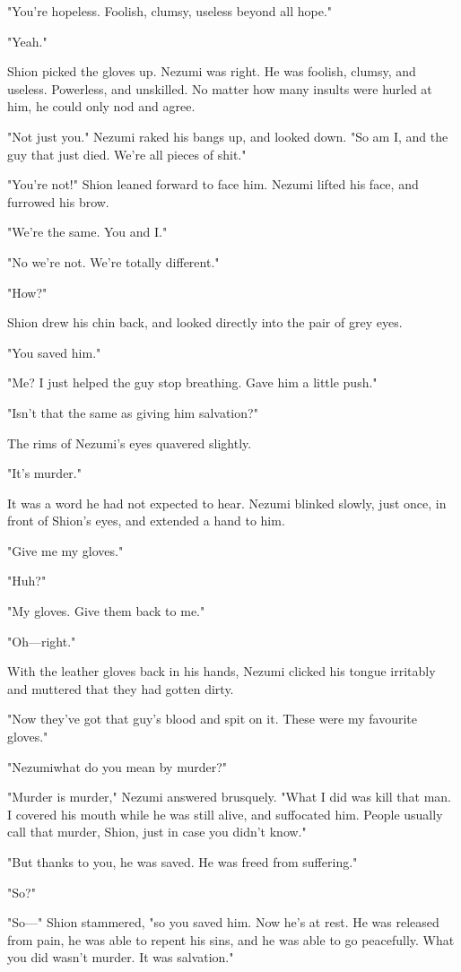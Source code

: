"You're hopeless. Foolish, clumsy, useless beyond all hope."

"Yeah."

Shion picked the gloves up. Nezumi was right. He was foolish, clumsy,
and useless. Powerless, and unskilled. No matter how many insults were
hurled at him, he could only nod and agree.

"Not just you." Nezumi raked his bangs up, and looked down. "So am I,
and the guy that just died. We're all pieces of shit."

"You're not!" Shion leaned forward to face him. Nezumi lifted his face,
and furrowed his brow.

"We're the same. You and I."

"No we're not. We're totally different."

"How?"

Shion drew his chin back, and looked directly into the pair of grey
eyes.

"You saved him."

"Me? I just helped the guy stop breathing. Gave him a little push."

"Isn't that the same as giving him salvation?"

The rims of Nezumi's eyes quavered slightly.

"It's murder."

It was a word he had not expected to hear. Nezumi blinked slowly, just
once, in front of Shion's eyes, and extended a hand to him.

"Give me my gloves."

"Huh?"

"My gloves. Give them back to me."

"Oh---right."

With the leather gloves back in his hands, Nezumi clicked his tongue
irritably and muttered that they had gotten dirty.

"Now they've got that guy's blood and spit on it. These were my
favourite gloves."

"Nezumi\el what do you mean by murder?"

"Murder is murder," Nezumi answered brusquely. "What I did was kill that
man. I covered his mouth while he was still alive, and suffocated him.
People usually call that murder, Shion, just in case you didn't know."

"But thanks to you, he was saved. He was freed from suffering."

"So?"

"So---" Shion stammered, "so you saved him. Now he's at rest. He was
released from pain, he was able to repent his sins, and he was able to
go peacefully. What you did wasn't murder. It was salvation."

